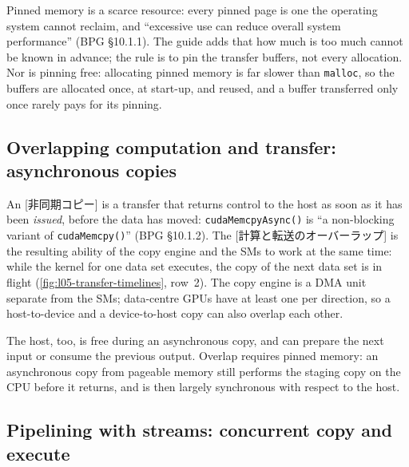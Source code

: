 \documentclass[../main.tex]{subfiles}
\begin{document}
Pinned memory is a scarce resource: every pinned page is one the
operating system cannot reclaim, and \enquote{excessive use can reduce
overall system performance} (BPG §10.1.1).  The guide adds that how much
is too much cannot be known in advance; the rule is to pin the transfer
buffers, not every allocation.  Nor is pinning free: allocating pinned
memory is far slower than \texttt{malloc}, so the buffers are allocated
once, at start-up, and reused, and a buffer transferred only once rarely
pays for its pinning.

\subsection{Overlapping computation and transfer: asynchronous copies}

\begin{definition}
  An [非同期コピー] is a transfer that returns
  control to the host as soon as it has been \emph{issued}, before the
  data has moved: \texttt{cudaMemcpyAsync()} is \enquote{a non-blocking
  variant of \texttt{cudaMemcpy()}} (BPG §10.1.2).  The
  [計算と転送のオーバーラップ] is
  the resulting ability of the copy engine and the SMs to work at the
  same time: while the kernel for one data set executes, the copy of the
  next data set is in flight (\cref{fig:l05-transfer-timelines},
  row~2).  The copy engine is a DMA unit separate from the SMs;
  data-centre GPUs have at least one per direction, so a host-to-device
  and a device-to-host copy can also overlap each other.
\end{definition}

The host, too, is free during an asynchronous copy, and can prepare the
next input or consume the previous output.  Overlap requires pinned
memory: an asynchronous copy from pageable memory still performs the
staging copy on the CPU before it returns, and is then largely
synchronous with respect to the host.

\subsection{Pipelining with streams: concurrent copy and execute}
\end{document}
